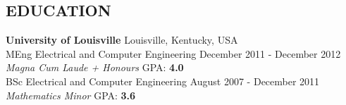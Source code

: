 \documentclass[margin, line]{res} %
\begin{document}
\begin{resume}
\section{EDUCATION}
{\textbf{University of Louisville}} \hfill Louisville, Kentucky, USA\\
{MEng Electrical and Computer Engineering}  \hfill December 2011 - December 2012 \\
{\sl Magna Cum Laude + Honours} \hfill GPA: \textbf{4.0}\\
{BSc Electrical and Computer Engineering}  \hfill August 2007 - December 2011 \\
{\sl Mathematics Minor} \hfill GPA: \textbf{3.6}
\vspace{-5mm}



\end{resume}
\end{document}
